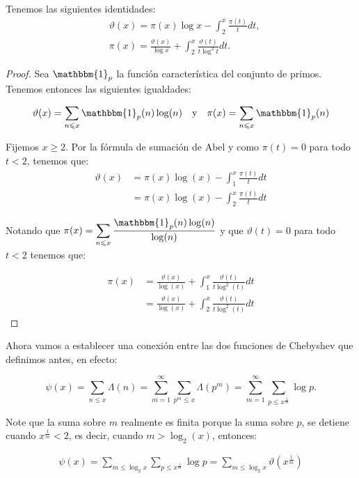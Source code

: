 \begin{theorem}\label{rep integral de pi x}
Tenemos las siguientes identidades:
    $$
    \begin{aligned}
    & \vartheta(x)=\pi(x) \log x-\int_2^x \frac{\pi(t)}{t} d t, \\
    & \pi(x)=\frac{\vartheta(x)}{\log x}+\int_2^x \frac{\vartheta(t)}{t \log ^2 t} d t .
    \end{aligned}
    $$
\end{theorem}

\begin{proof}
Sea  $\mathbbm{1}_{p}$ la función característica del conjunto de primos. Tenemos entonces las siguientes igualdades:

$$\vartheta(x)=\sum_{n \leqslant x} \mathbbm{1}_p(n) \log (n)\quad \text{y}\quad \pi(x)=\sum_{n \leqslant x} \mathbbm{1}_p(n)$$

Fijemos $x \geqslant 2$. Por la fórmula de sumación de Abel y como $\pi(t)=0$ para todo $t<2$, tenemos que:
$$
\begin{aligned}
\vartheta(x) & =\pi(x) \log (x)-\int_1^x \frac{\pi(t)}{t} d t \\
& =\pi(x) \log (x)-\int_2^x \frac{\pi(t)}{t} d t
\end{aligned}
$$

Notando que $\pi(x)=\displaystyle\sum_{n \leqslant x} \dfrac{\mathbbm{1}_p(n) \log (n)}{\log (n)}$ y que $\vartheta(t)=0$ para todo $t<2$ tenemos que:

$$
\begin{aligned}
\pi(x) & =\frac{\vartheta(x)}{\log (x)}+\int_1^x \frac{\vartheta(t)}{t \log ^2(t)} d t \\
& =\frac{\vartheta(x)}{\log (x)}+\int_2^x \frac{\vartheta(t)}{t \log ^2(t)} d t
\end{aligned}
$$
\end{proof}

Ahora vamos a establecer una conexión entre las dos funciones de Chebyshev que definimos antes, en efecto:

$$
\psi(x)=\sum_{n \leq x} \Lambda(n)=\sum_{m=1}^{\infty} \sum_{p^m \leq x} \Lambda\left(p^m\right)=\sum_{m=1}^{\infty} \sum_{p \leq x^{\frac{1}{m}}} \log p .
$$

Note que la suma sobre $m$ realmente es finita porque la suma sobre $p$, se  detiene cuando $x^{\frac{1}{m}}<2$, es decir, cuando $m>\log_2(x)$, entonces:

\begin{align}
    \psi(x)=\sum_{m \leq \log _2 x} \sum_{p \leq x^{\frac{1}{m}}} \log p=\sum_{m \leq \log _2 x} \vartheta\left(x^{\frac{1}{m}}\right)
\end{align}

